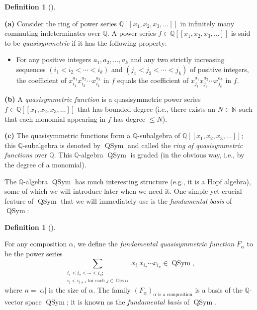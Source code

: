 \documentclass[numbers=enddot,12pt,final,onecolumn,notitlepage]{scrartcl}%
\theoremstyle{definition}
\newtheorem{defi}[theo]{Definition}
\newenvironment{definition}[1][]
{\begin{defi}[#1]\begin{leftbar}}
{\end{leftbar}\end{defi}}
\let\sumnonlimits\sum
\renewcommand{\sum}{\sumnonlimits\limits}
\begin{document}
\begin{definition}
\textbf{(a)}
Consider the ring of power series $\mathbb{Q}\left[  \left[  x_{1},x_{2}%
,x_{3},\ldots\right]  \right]  $ in infinitely many commuting indeterminates
over $\mathbb{Q}$.
A power series $f\in\mathbb{Q}\left[  \left[  x_{1}%
,x_{2},x_{3},\ldots\right]  \right]  $ is said to be \textit{quasisymmetric}
if it has the following property:
\begin{itemize}
\item For any positive integers $a_{1}%
,a_{2},\ldots,a_{k}$ and any two strictly increasing sequences $\left(
i_{1}<i_{2}<\cdots<i_{k}\right)  $ and $\left(  j_{1}<j_{2}<\cdots
<j_{k}\right)  $ of positive integers, the coefficient of $x_{i_{1}}^{a_{1}%
}x_{i_{2}}^{a_{2}}\cdots x_{i_{k}}^{a_{k}}$ in $f$ equals the coefficient of
$x_{j_{1}}^{a_{1}}x_{j_{2}}^{a_{2}}\cdots x_{j_{k}}^{a_{k}}$ in $f$.
\end{itemize}

\textbf{(b)}
A \textit{quasisymmetric function} is a quasisymmetric power series
$f\in\mathbb{Q}\left[  \left[  x_{1},x_{2},x_{3},\ldots\right]  \right]  $
that has bounded degree (i.e., there exists an $N\in\mathbb{N}$ such that each
monomial appearing in $f$ has degree $\leq N$).

\textbf{(c)} The quasisymmetric functions
form a $\mathbb{Q}$-subalgebra of $\mathbb{Q}\left[  \left[  x_{1},x_{2}%
,x_{3},\ldots\right]  \right]  $; this $\mathbb{Q}$-subalgebra is denoted by
$\operatorname*{QSym}$ and called the \textit{ring of quasisymmetric
functions} over $\mathbb{Q}$.
This $\mathbb{Q}$-algebra $\operatorname{QSym}$ is graded (in the obvious way,
i.e., by the degree of a monomial).
\end{definition}

The $\mathbb{Q}$-algebra $\operatorname*{QSym}$ has much interesting structure
(e.g., it is a Hopf algebra), some of which we will introduce later when we
need it. One simple yet crucial feature of $\operatorname*{QSym}$ that we will
immediately use is the \textit{fundamental basis} of $\operatorname*{QSym}$:

\begin{definition}
For any composition $\alpha$, we define the \textit{fundamental quasisymmetric
function} $F_{\alpha}$ to be the power series%
\[
\sum_{\substack{i_{1}\leq i_{2}\leq\cdots\leq i_{n};\\i_{j}<i_{j+1}\text{ for
each }j\in\operatorname*{Des}\alpha}}x_{i_{1}}x_{i_{2}}\cdots x_{i_{n}}%
\in\operatorname*{QSym},
\]
where $n=\left\vert \alpha\right\vert $ is the size of $\alpha$. The family
$\left(  F_{\alpha}\right)  _{\alpha\text{ is a composition}}$ is a basis of
the $\mathbb{Q}$-vector space $\operatorname*{QSym}$; it is known as the
\textit{fundamental basis} of $\operatorname*{QSym}$.
\end{definition}
\end{document}
